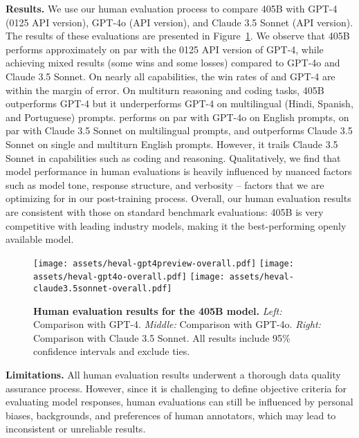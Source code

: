 \textbf{Results.}
We use our human evaluation process to compare \llamathree 405B with GPT-4 (0125 API version), GPT-4o (API version), and Claude 3.5 Sonnet (API version).
The results of these evaluations are presented in Figure~\ref{fig:human_evaluation_results}.
We observe that \llamathree 405B performs approximately on par with the 0125 API version of GPT-4,
while achieving mixed results (some wins and some losses) compared to GPT-4o and Claude 3.5 Sonnet.
On nearly all capabilities, the win rates of \llamathree and GPT-4 are within the margin of error.
On multiturn reasoning and coding tasks, \llamathree 405B outperforms GPT-4 but it underperforms GPT-4 on multilingual (Hindi, Spanish, and Portuguese) prompts.
\llamathree performs on par with GPT-4o on English prompts, on par with Claude 3.5 Sonnet on multilingual prompts, and outperforms Claude 3.5 Sonnet on single and multiturn English prompts.
However, it trails Claude 3.5 Sonnet in capabilities such as coding and reasoning.
Qualitatively, we find that model performance in human evaluations is heavily influenced by nuanced factors such as model tone, response structure, and verbosity -- factors that we are optimizing for in our post-training process.
Overall, our human evaluation results are consistent with those on standard benchmark evaluations: \llamathree 405B is very competitive with leading industry models, making it the best-performing openly available model.



\begin{figure}[t]
    \centering
    \texttt{[image: assets/heval-gpt4preview-overall.pdf]}\hspace{-0.03\linewidth}
    \texttt{[image: assets/heval-gpt4o-overall.pdf]}\hspace{-0.03\linewidth}
    \texttt{[image: assets/heval-claude3.5sonnet-overall.pdf]}
    \caption{\textbf{Human evaluation results for the \llamathree 405B model.} \emph{Left:} Comparison with GPT-4. \emph{Middle:} Comparison with GPT-4o. \emph{Right:} Comparison with Claude 3.5 Sonnet. All results include 95\% confidence intervals and exclude ties.}
    \label{fig:human_evaluation_results}
\end{figure}

\textbf{Limitations.} All human evaluation results underwent a thorough data quality assurance process.
However, since it is challenging to define objective criteria for evaluating model responses, human evaluations can still be influenced by personal biases, backgrounds, and preferences of human annotators, which may lead to inconsistent or unreliable results.
